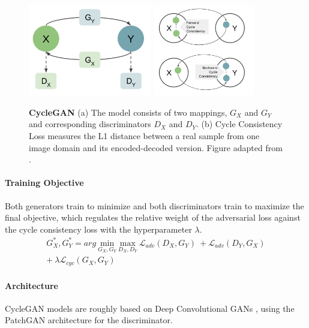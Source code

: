 \documentclass{article}
\begin{document}
\begin{figure}[t]
\centering
{}
{\includegraphics[height=4cm]{GAN/cyclegan1}}\hspace{1cm}
{\includegraphics[height=4cm]{GAN/cyclegan2}}
\caption{\label{fig:cyclegan} \textbf{CycleGAN} (a) The model consists of two mappings, $G_{X}$ and $G_{Y}$ and corresponding discriminators $D_{X}$ and $D_{Y}$. (b) Cycle Consistency Loss measures the L1 distance between a real sample from one image domain and its encoded-decoded version. Figure adapted from \cite{zhu_unpaired_2017}.}
\end{figure}


\paragraph{Training Objective}
Both generators train to minimize and both discriminators train to maximize the final objective, which regulates the relative weight of the adversarial loss against the cycle consistency loss with the hyperparameter $\lambda$.
\begin{equation}
\begin{split}
G^{*}_{X}, G^{*}_{Y} = arg \ \underset{G_{X}, G_{Y}}{\mathrm{min}} \ \underset{D_{X}, D_{Y}}{\mathrm{max}} \ \mathcal{L}_{adv}(D_{X},G_{Y}) \ +  \mathcal{L}_{adv}(D_{Y}, G_{X}) \\ + \ \lambda \mathcal{L}_{cyc}(G_{X}, G_{Y})
\end{split}
\end{equation}

\paragraph{Architecture}
CycleGAN models are roughly based on Deep Convolutional GANs \cite{radford_unsupervised_2015}, using the PatchGAN architecture \cite{isola_image--image_2016} for the discriminator.
\end{document}
